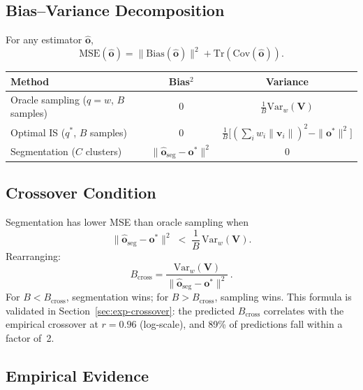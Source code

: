 \documentclass[11pt,a4paper]{article}
\theoremstyle{definition}
\newcommand{\vv}{\mathbf{v}}
\newcommand{\oo}{\mathbf{o}}
\newcommand{\Var}{\mathrm{Var}}
\newcommand{\Cov}{\mathrm{Cov}}
\newcommand{\Tr}{\mathrm{Tr}}
\newcommand{\MSE}{\mathrm{MSE}}
\newcommand{\Bias}{\mathrm{Bias}}
\begin{document}
\subsection{Bias--Variance Decomposition}

For any estimator $\hat{\oo}$,
\begin{equation}
  \MSE(\hat{\oo})
  = \|\Bias(\hat{\oo})\|^2 + \Tr(\Cov(\hat{\oo})).
\end{equation}

\begin{center}
\begin{tabular}{lcc}
\toprule
\textbf{Method} & \textbf{Bias$^2$} & \textbf{Variance}\\
\midrule
Oracle sampling ($q=w$, $B$ samples) & $0$ &
  $\frac{1}{B}\Var_w(\mathbf{V})$\\[4pt]
Optimal IS ($q^*$, $B$ samples) & $0$ &
  $\frac{1}{B}\bigl[(\sum_i w_i\|\vv_i\|)^2 - \|\oo^*\|^2\bigr]$\\[4pt]
Segmentation ($C$ clusters) &
  $\|\hat{\oo}_{\mathrm{seg}}-\oo^*\|^2$ & $0$\\
\bottomrule
\end{tabular}
\end{center}

\subsection{Crossover Condition}

Segmentation has lower MSE than oracle sampling when
\begin{equation}\label{eq:crossover}
  \boxed{
    \|\hat{\oo}_{\mathrm{seg}} - \oo^{*}\|^{2}
    \;<\;
    \frac{1}{B}\,\Var_w(\mathbf{V}).
  }
\end{equation}
Rearranging:
\begin{equation}\label{eq:Bcross}
  B_{\mathrm{cross}}
  = \frac{\Var_w(\mathbf{V})}
         {\|\hat{\oo}_{\mathrm{seg}} - \oo^{*}\|^{2}}\,.
\end{equation}
For $B < B_{\mathrm{cross}}$, segmentation wins; for
$B > B_{\mathrm{cross}}$, sampling wins.
This formula is validated in Section~\ref{sec:exp-crossover}: the predicted
$B_{\mathrm{cross}}$ correlates with the empirical crossover at $r=0.96$
(log-scale), and 89\% of predictions fall within a factor of~2.

\subsection{Empirical Evidence}
\end{document}
